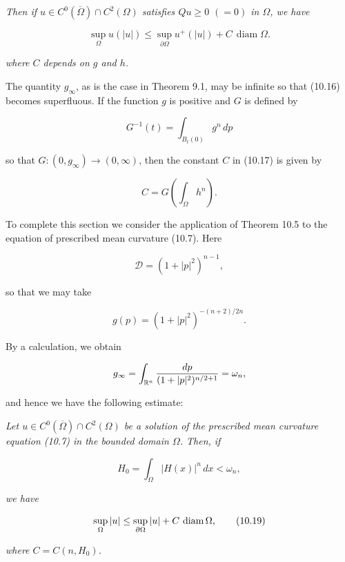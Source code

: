 \begin{theorem}
\begin{theorem}
\textit{Then if $u \in C^0(\overline{\Omega}) \cap C^2(\Omega)$ satisfies $Qu \ge 0$ $(=0)$ in $\Omega$, we have}

\begin{equation}
\sup_{\Omega} u(|u|) \le \sup_{\partial\Omega} u^+(|u|) + C\,\operatorname{diam}\Omega.
\tag{10.17}
\end{equation}

\textit{where $C$ depends on $g$ and $h$.}
\end{theorem}

The quantity $g_{\infty}$, as is the case in Theorem 9.1, may be infinite so that (10.16)
becomes superfluous. If the function $g$ is positive and $G$ is defined by

\[
G^{-1}(t) = \int_{B_t(0)} g^n\,dp
\]

so that $G:(0,g_{\infty}) \to (0,\infty)$, then the constant $C$ in (10.17) is given by

\[
C = G\!\left(\int_{\Omega} h^n\right).
\]
\end{theorem}






To complete this section we consider the application of Theorem 10.5 to the equation of prescribed mean curvature (10.7). Here

\[
\mathscr{D} = (1 + |p|^2)^{n-1},
\]

so that we may take

\[
g(p) = (1 + |p|^2)^{-(n+2)/2n}.
\]

By a calculation, we obtain

\[
g_\infty = \int_{\mathbb{R}^n} \frac{dp}{(1 + |p|^2)^{n/2 + 1}} = \omega_n,
\]

and hence we have the following estimate:

\begin{corollary}\label{gilbarg-trudinger.cor.10.6.prescribed-mean-curvature-bound}
\textit{Let $u \in C^0(\overline{\Omega}) \cap C^2(\Omega)$ be a solution of the prescribed mean curvature equation (10.7) in the bounded domain $\Omega$. Then, if}

\begin{equation}
H_0 = \int_\Omega |H(x)|^n\,dx < \omega_n,
\tag{10.18}
\end{equation}

\textit{we have}

\begin{equation}
\sup_\Omega |u| \le \sup_{\partial\Omega} |u| + C\,\operatorname{diam} \Omega,
\tag{10.19}
\end{equation}

\textit{where $C = C(n, H_0)$.}
\end{corollary}


